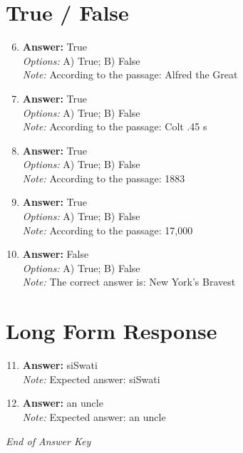 \documentclass[12pt]{article}
\begin{document}
\section*{True / False}
\begin{enumerate}[label=\arabic*.]
\setcounter{enumi}{5}
\item \textbf{Answer:} True
\\ \textit{Options:} A) True; B) False
\\ \textit{Note:} According to the passage: Alfred the Great
\item \textbf{Answer:} True
\\ \textit{Options:} A) True; B) False
\\ \textit{Note:} According to the passage: Colt .45 s
\item \textbf{Answer:} True
\\ \textit{Options:} A) True; B) False
\\ \textit{Note:} According to the passage: 1883
\item \textbf{Answer:} True
\\ \textit{Options:} A) True; B) False
\\ \textit{Note:} According to the passage: 17,000
\item \textbf{Answer:} False
\\ \textit{Options:} A) True; B) False
\\ \textit{Note:} The correct answer is: New York's Bravest
\end{enumerate}

\section*{Long Form Response}
\begin{enumerate}[label=\arabic*.]
\setcounter{enumi}{10}
\item \textbf{Answer:} siSwati
\\ \textit{Note:} Expected answer: siSwati
\item \textbf{Answer:} an uncle
\\ \textit{Note:} Expected answer: an uncle
\end{enumerate}

\vfill
\noindent\textit{End of Answer Key}
\end{document}
